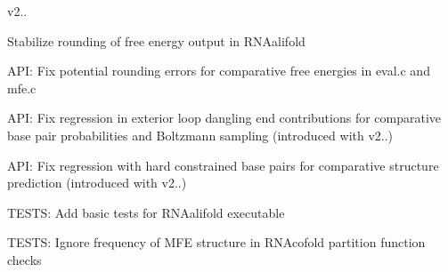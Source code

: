 v2..
\begin{DoxyItemize}
\item Stabilize rounding of free energy output in R\+N\+Aalifold
\item A\+PI\+: Fix potential rounding errors for comparative free energies in eval.\+c and mfe.\+c
\item A\+PI\+: Fix regression in exterior loop dangling end contributions for comparative base pair probabilities and Boltzmann sampling (introduced with v2..)
\item A\+PI\+: Fix regression with hard constrained base pairs for comparative structure prediction (introduced with v2..)
\item T\+E\+S\+TS\+: Add basic tests for R\+N\+Aalifold executable
\item T\+E\+S\+TS\+: Ignore \textquotesingle{}frequency of M\+FE structure\textquotesingle{} in R\+N\+Acofold partition function checks
\end{DoxyItemize}

